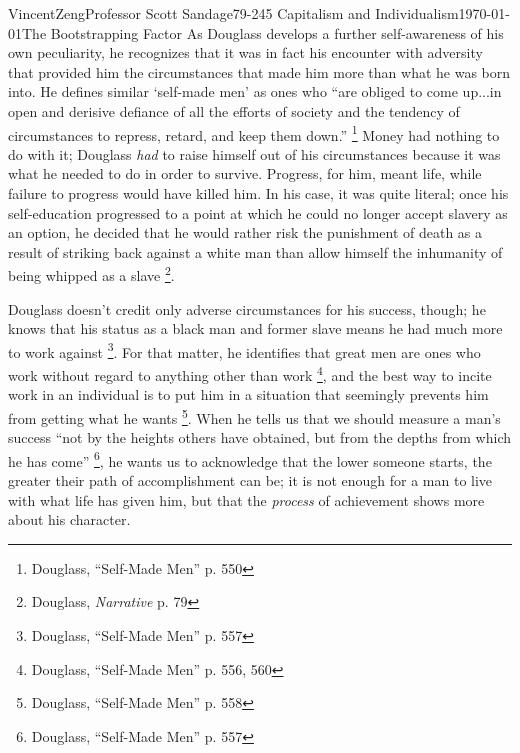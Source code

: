 \documentclass[12pt]{article}
\begin{document}
\begin{mla}{Vincent}{Zeng}{Professor Scott Sandage}{79-245 Capitalism and Individualism}{\today}{The Bootstrapping
Factor}
	As Douglass develops a further self-awareness of his own peculiarity,
	he recognizes that it was in fact his encounter with adversity that
	provided him the circumstances that made him more than what he was born
	into. He defines similar `self-made men' as ones who ``are obliged to
	come up...in open and derisive defiance of all the efforts of society
	and the tendency of circumstances to repress, retard, and keep them
	down.'' \footnote{Douglass, ``Self-Made Men'' p. 550} Money had nothing
	to do with it; Douglass \textit{had} to raise himself out of his
	circumstances because it was what he needed to do in order to survive.
	Progress, for him, meant life, while failure to progress would have
	killed him. In his case, it was quite literal; once his self-education
	progressed to a point at which he could no longer accept slavery as an
	option, he decided that he would rather risk the punishment of death as a result of striking back
	against a white man than allow himself the inhumanity of being whipped
	as a slave \footnote{Douglass, \textit{Narrative} p. 79}.

	Douglass doesn't credit only adverse circumstances for his success,
	though; he knows that his status as a black man and former slave means
	he had much more to work against \footnote{Douglass, ``Self-Made Men''
	p. 557}. For that matter, he identifies that great men are ones who
	work without regard to anything other than work \footnote{Douglass,
	``Self-Made Men'' p. 556, 560}, and the best way to incite work in an
	individual is to put him in a situation that seemingly prevents him
	from getting what he wants \footnote{Douglass, ``Self-Made Men'' p.
	558}. When he tells us that we should measure a man's success ``not by
	the heights others have obtained, but from the depths from which he has
	come'' \footnote{Douglass, ``Self-Made Men'' p. 557}, he wants us to
	acknowledge that the lower someone starts, the greater their path of
	accomplishment can be; it is not enough for a man to live with what
	life has given him, but that the \textit{process} of achievement shows
	more about his character.


\end{mla}
\end{document}
